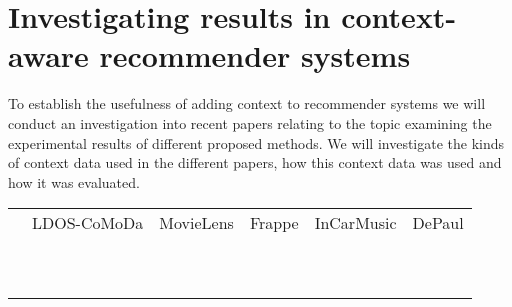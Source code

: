 \section{Investigating results in context-aware recommender systems}
To establish the usefulness of adding context to recommender systems we will conduct an investigation into recent papers relating to the topic examining the experimental results of different proposed methods.
We will investigate the kinds of context data used in the different papers, how this context data was used and how it was evaluated.


\begin{table}[]
    \begin{tabular}{llllll}
     & LDOS-CoMoDa & MovieLens & Frappe & InCarMusic & DePaul \\
     &             &           &        &            &        \\
     &             &           &        &            &        \\
     &             &           &        &            &        \\
     &             &           &        &            &        \\
     &             &           &        &            &        \\
     &             &           &        &            &        \\
     &             &           &        &            &        \\
     &             &           &        &            &        \\
     &             &           &        &            &        \\
     &             &           &        &            &       
    \end{tabular}
\end{table}